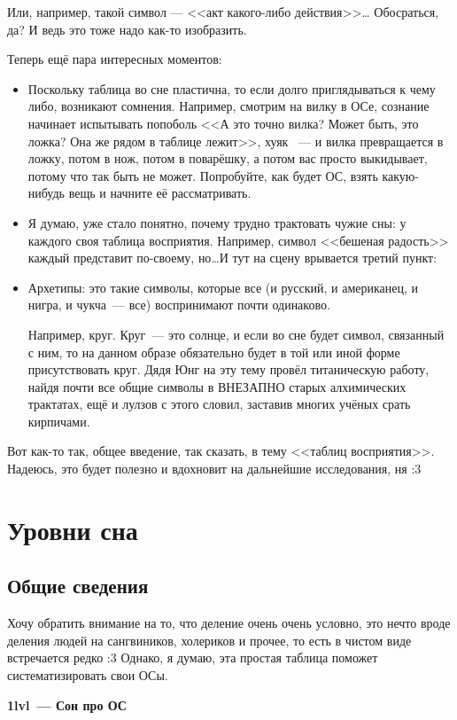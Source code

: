 \documentclass[a5paper,12pt,twoside]{memoir}
\begin{document}
Или, например, такой символ — <<акт какого-либо действия>>… Обосраться, да? И ведь это тоже надо как-то изобразить. 

Теперь ещё пара интересных моментов:
\begin{itemize}
\item Поскольку таблица во сне пластична, то если долго приглядываться к чему либо, возникают сомнения. Например, смотрим на вилку в ОСе, сознание начинает испытывать попоболь <<А это точно вилка? Может быть, это ложка? Она же рядом в таблице лежит>>, хуяк ~--- и вилка превращается в ложку, потом в нож, потом в поварёшку, а потом вас просто выкидывает, потому что так быть не может. Попробуйте, как будет ОС, взять какую-нибудь вещь и начните её рассматривать. 
\item Я думаю, уже стало понятно, почему трудно трактовать чужие сны: у каждого своя таблица восприятия. Например, символ <<бешеная радость>> каждый представит по-своему, но\ldots И тут на сцену врывается третий пункт:
\item Архетипы: это такие символы, которые все (и русский, и американец, и нигра, и чукча~--- все) воспринимают почти одинаково.
 
Например, круг. Круг~--- это солнце, и если во сне будет символ, связанный с ним, то на данном образе обязательно будет в той или иной форме присутствовать круг. Дядя Юнг на эту тему провёл титаническую работу, найдя почти все общие символы в ВНЕЗАПНО старых алхимических трактатах, ещё и лулзов с этого словил, заставив многих учёных срать кирпичами.
\end{itemize}

Вот как-то так, общее введение, так сказать, в тему <<таблиц восприятия>>. Надеюсь, это будет полезно и вдохновит на дальнейшие исследования, ня :3 



\chapter{Уровни сна}


\section{Общие сведения}
Хочу обратить внимание на то, что деление очень очень условно, это нечто вроде деления людей на сангвиников, холериков и прочее, то есть в чистом виде встречается редко :3 Однако, я думаю, эта простая таблица поможет систематизировать свои ОСы.


\begin{center}
\textbf{1lvl~--- Сон про ОС}
\end{center}
\end{document}
